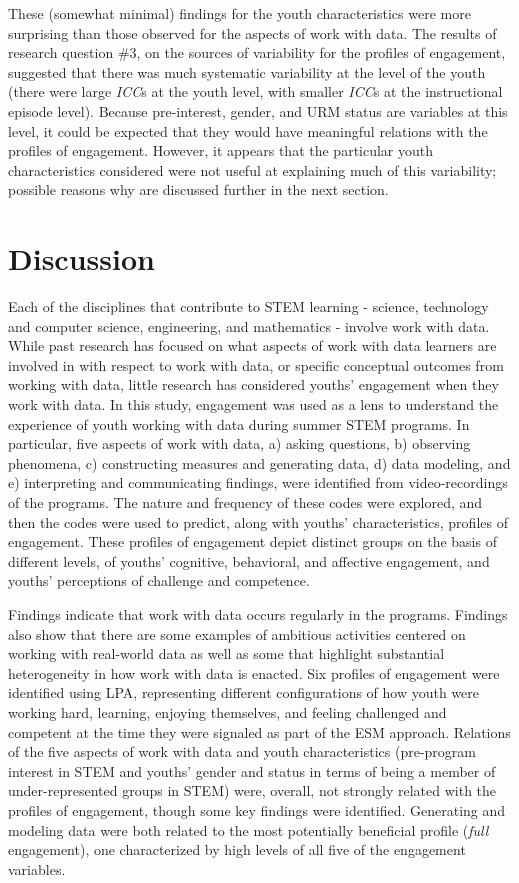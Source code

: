 \documentclass[]{msu-thesis}
\theoremstyle{definition}
\theoremstyle{definition}
\theoremstyle{definition}
\theoremstyle{remark}
\begin{document}
These (somewhat minimal) findings for the youth characteristics were
more surprising than those observed for the aspects of work with data.
The results of research question \#3, on the sources of variability for
the profiles of engagement, suggested that there was much systematic
variability at the level of the youth (there were large \emph{ICC}s at
the youth level, with smaller \emph{ICC}s at the instructional episode
level). Because pre-interest, gender, and URM status are variables at
this level, it could be expected that they would have meaningful
relations with the profiles of engagement. However, it appears that the
particular youth characteristics considered were not useful at
explaining much of this variability; possible reasons why are discussed
further in the next section.

\chapter{Discussion}\label{discussion}

Each of the disciplines that contribute to STEM learning - science,
technology and computer science, engineering, and mathematics - involve
work with data. While past research has focused on what aspects of work
with data learners are involved in with respect to work with data, or
specific conceptual outcomes from working with data, little research has
considered youths' engagement when they work with data. In this study,
engagement was used as a lens to understand the experience of youth
working with data during summer STEM programs. In particular, five
aspects of work with data, a) asking questions, b) observing phenomena,
c) constructing measures and generating data, d) data modeling, and e)
interpreting and communicating findings, were identified from
video-recordings of the programs. The nature and frequency of these
codes were explored, and then the codes were used to predict, along with
youths' characteristics, profiles of engagement. These profiles of
engagement depict distinct groups on the basis of different levels, of
youths' cognitive, behavioral, and affective engagement, and youths'
perceptions of challenge and competence.

Findings indicate that work with data occurs regularly in the programs.
Findings also show that there are some examples of ambitious activities
centered on working with real-world data as well as some that highlight
substantial heterogeneity in how work with data is enacted. Six profiles
of engagement were identified using LPA, representing different
configurations of how youth were working hard, learning, enjoying
themselves, and feeling challenged and competent at the time they were
signaled as part of the ESM approach. Relations of the five aspects of
work with data and youth characteristics (pre-program interest in STEM
and youths' gender and status in terms of being a member of
under-represented groups in STEM) were, overall, not strongly related
with the profiles of engagement, though some key findings were
identified. Generating and modeling data were both related to the most
potentially beneficial profile (\emph{full} engagement), one
characterized by high levels of all five of the engagement variables.
\end{document}
